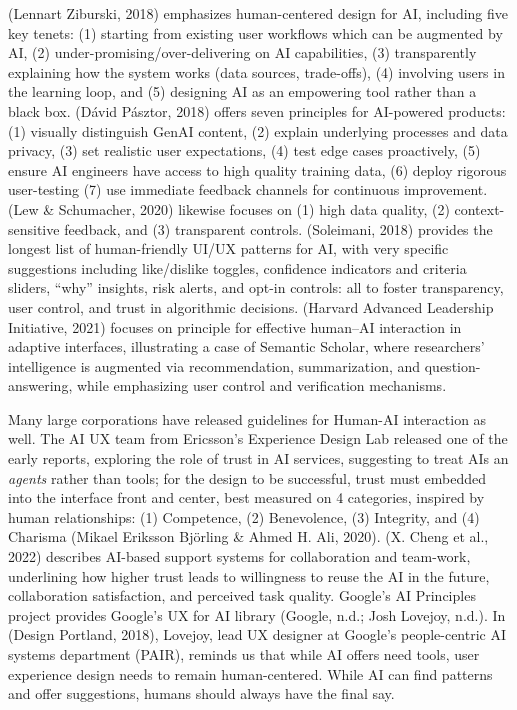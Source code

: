 \documentclass[
  12pt,
  letterpaper,
  DIV=11,
  numbers=noendperiod]{scrartcl}
\begin{document}
(Lennart Ziburski, 2018) emphasizes human-centered design for AI,
including five key tenets: (1) starting from existing user workflows
which can be augmented by AI, (2) under-promising/over-delivering on AI
capabilities, (3) transparently explaining how the system works (data
sources, trade-offs), (4) involving users in the learning loop, and (5)
designing AI as an empowering tool rather than a black box. (Dávid
Pásztor, 2018) offers seven principles for AI-powered products: (1)
visually distinguish GenAI content, (2) explain underlying processes and
data privacy, (3) set realistic user expectations, (4) test edge cases
proactively, (5) ensure AI engineers have access to high quality
training data, (6) deploy rigorous user-testing (7) use immediate
feedback channels for continuous improvement. (Lew \& Schumacher, 2020)
likewise focuses on (1) high data quality, (2) context-sensitive
feedback, and (3) transparent controls. (Soleimani, 2018) provides the
longest list of human-friendly UI/UX patterns for AI, with very specific
suggestions including like/dislike toggles, confidence indicators and
criteria sliders, ``why'' insights, risk alerts, and opt-in controls:
all to foster transparency, user control, and trust in algorithmic
decisions. (Harvard Advanced Leadership Initiative, 2021) focuses on
principle for effective human--AI interaction in adaptive interfaces,
illustrating a case of Semantic Scholar, where researchers' intelligence
is augmented via recommendation, summarization, and question-answering,
while emphasizing user control and verification mechanisms.

Many large corporations have released guidelines for Human-AI
interaction as well. The AI UX team from Ericsson's Experience Design
Lab released one of the early reports, exploring the role of trust in AI
services, suggesting to treat AIs an \emph{agents} rather than tools;
for the design to be successful, trust must embedded into the interface
front and center, best measured on 4 categories, inspired by human
relationships: (1) Competence, (2) Benevolence, (3) Integrity, and (4)
Charisma (Mikael Eriksson Björling \& Ahmed H. Ali, 2020). (X. Cheng et
al., 2022) describes AI-based support systems for collaboration and
team-work, underlining how higher trust leads to willingness to reuse
the AI in the future, collaboration satisfaction, and perceived task
quality. Google's AI Principles project provides Google's UX for AI
library (Google, n.d.; Josh Lovejoy, n.d.). In (Design Portland, 2018),
Lovejoy, lead UX designer at Google's people-centric AI systems
department (PAIR), reminds us that while AI offers need tools, user
experience design needs to remain human-centered. While AI can find
patterns and offer suggestions, humans should always have the final say.
\end{document}
